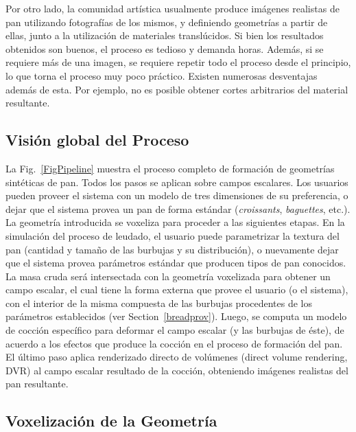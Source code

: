 \documentclass[spanish,a4paper,openright,11pt]{book}
\begin{document}
Por otro lado, la comunidad artística usualmente produce imágenes realistas de pan utilizando fotografías de los mismos, y definiendo geometrías a partir de ellas, junto a la utilización de materiales translúcidos.
Si bien los resultados obtenidos son buenos, el proceso es tedioso y demanda horas.
Además, si se requiere más de una imagen, se requiere repetir todo el proceso desde el principio, lo que torna el proceso muy poco práctico.
Existen numerosas desventajas además de esta.
Por ejemplo, no es posible obtener cortes arbitrarios del material resultante.


\subsection{Visión global del Proceso}
La Fig.~\ref{FigPipeline} muestra el proceso completo de formación de geometrías sintéticas de pan.
Todos los pasos se aplican sobre campos escalares.
Los usuarios pueden proveer el sistema con un modelo de tres dimensiones de su preferencia, o dejar que el sistema provea un pan de forma estándar ({\em croissants}, {\em baguettes}, etc.).
La geometría introducida se voxeliza para proceder a las siguientes etapas.
En la simulación del proceso de leudado, el usuario puede parametrizar la textura del pan (cantidad y tamaño de las burbujas y su distribución), o nuevamente dejar que el sistema provea parámetros estándar que producen tipos de pan conocidos.
La masa cruda será intersectada con la geometría voxelizada para obtener un campo escalar, el cual tiene la forma externa que provee el usuario (o el sistema), con el interior de la misma compuesta de las burbujas procedentes de los parámetros establecidos (ver Section~\ref{breadprov}).
Luego, se computa un modelo de cocción específico \cite{Powathil2004} para deformar el campo escalar (y las burbujas de éste), de acuerdo a los efectos que produce la cocción en el proceso de formación del pan.
El último paso aplica renderizado directo de volúmenes (direct volume rendering, DVR) \cite{Kruger2003} al campo escalar resultado de la cocción, obteniendo imágenes realistas del pan resultante.


\subsection{Voxelización de la Geometría}
\end{document}
